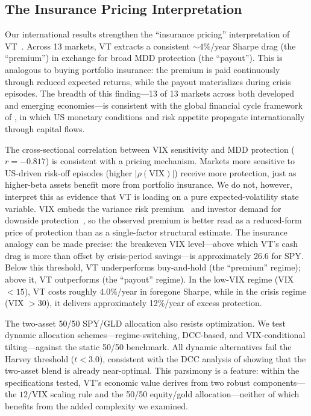 \subsection{The Insurance Pricing Interpretation}

Our international results strengthen the ``insurance pricing'' interpretation of VT~\citep{lai2026a}. Across 13 markets, VT extracts a consistent ${\sim}4\%$/year Sharpe drag (the ``premium'') in exchange for broad MDD protection (the ``payout''). This is analogous to buying portfolio insurance: the premium is paid continuously through reduced expected returns, while the payout materializes during crisis episodes. The breadth of this finding---13 of 13 markets across both developed and emerging economies---is consistent with the global financial cycle framework of \citet{miranda2020}, in which US monetary conditions and risk appetite propagate internationally through capital flows.

The cross-sectional correlation between VIX sensitivity and MDD protection ($r = -0.817$) is consistent with a pricing mechanism. Markets more sensitive to US-driven risk-off episodes (higher $|\rho(\text{VIX})|$) receive more protection, just as higher-beta assets benefit more from portfolio insurance. We do not, however, interpret this as evidence that VT is loading on a pure expected-volatility state variable. VIX embeds the variance risk premium~\citep{bollerslev2009} and investor demand for downside protection~\citep{bondarenko2019}, so the observed premium is better read as a reduced-form price of protection than as a single-factor structural estimate. The insurance analogy can be made precise: the breakeven VIX level---above which VT's cash drag is more than offset by crisis-period savings---is approximately 26.6 for SPY. Below this threshold, VT underperforms buy-and-hold (the ``premium'' regime); above it, VT outperforms (the ``payout'' regime). In the low-VIX regime (VIX $< 15$), VT costs roughly 4.0\%/year in foregone Sharpe, while in the crisis regime (VIX $> 30$), it delivers approximately 12\%/year of excess protection.

The two-asset 50/50 SPY/GLD allocation also resists optimization. We test dynamic allocation schemes---regime-switching, DCC-based, and VIX-conditional tilting---against the static 50/50 benchmark. All dynamic alternatives fail the Harvey threshold ($t < 3.0$), consistent with the DCC analysis of \citet{lai2026a} showing that the two-asset blend is already near-optimal. This parsimony is a feature: within the specifications tested, VT's economic value derives from two robust components---the $12/\text{VIX}$ scaling rule and the 50/50 equity/gold allocation---neither of which benefits from the added complexity we examined.

